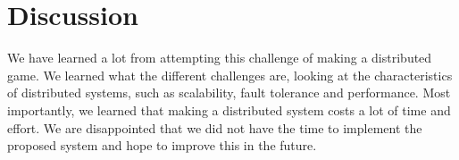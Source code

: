 \section{Discussion}
\label{chap:discussion}
We have learned a lot from attempting this challenge of making a distributed game. We learned what the different challenges are, looking at the characteristics of distributed systems, such as scalability, fault tolerance and performance. Most importantly, we learned that making a distributed system costs a lot of time and effort. We are disappointed that we did not have the time to implement the proposed system and hope to improve this in the future. 